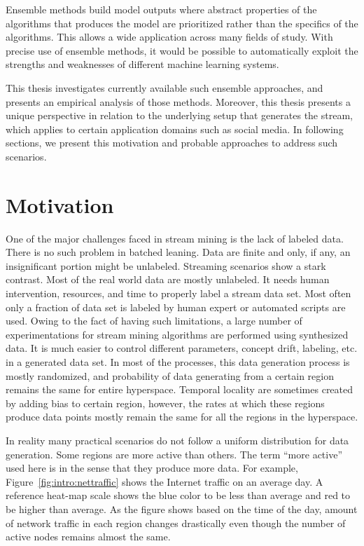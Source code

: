 Ensemble methods build model outputs where abstract properties of the algorithms that produces the model are prioritized rather than the specifics of the algorithms. This allows a wide application across many fields of study. With precise use of ensemble methods, it would be possible to automatically exploit the strengths and weaknesses of different machine learning systems.

This thesis investigates currently available such ensemble approaches, and presents an empirical analysis of those methods. Moreover, this thesis presents a unique perspective in relation to the underlying setup that generates the stream, which applies to certain application domains such as social media. In following sections, we present this motivation and probable approaches to address such scenarios.

\section{Motivation}
\label{sec:intro:motiv}
One of the major challenges faced in stream mining is the lack of labeled data. There is no such problem in batched leaning. Data are finite and only, if any, an insignificant portion might be unlabeled. Streaming scenarios show a stark contrast. Most of the real world data are mostly unlabeled. It needs human intervention, resources, and time to properly label a stream data set. Most often only a fraction of data set is labeled by human expert or automated scripts are used. Owing to the fact of having such limitations, a large number of experimentations for stream mining algorithms are performed using synthesized data. It is much easier to control different parameters, concept drift, labeling, etc. in a generated data set. In most of the processes, this data generation process is mostly randomized, and probability of data generating from a certain region remains the same for entire hyperspace. Temporal locality are sometimes created by adding bias to certain region, however, the rates at which these regions produce data points mostly remain the same for all the regions in the hyperspace.

In reality many practical scenarios do not follow a uniform distribution for data generation. Some regions are more active than others. The term ``more active'' used here is in the sense that they produce more data. For example, Figure~\ref{fig:intro:nettraffic} shows the Internet traffic on an average day. A reference heat-map scale shows the blue color to be less than average and red to be higher than average. As the figure shows based on the time of the day, amount of network traffic in each region changes drastically even though the number of active nodes remains almost the same.

